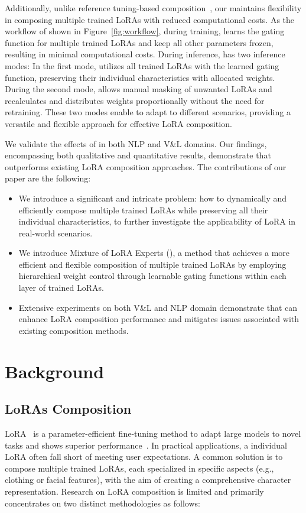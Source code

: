 Additionally, unlike reference tuning-based composition~\citep{gu2023mix}, our \our{} maintains flexibility in composing multiple trained LoRAs with reduced computational costs.
As the workflow of \our{} shown in Figure~\ref{fig:workflow}, during training, \our{} learns the gating function for multiple trained LoRAs and keep all other parameters frozen, resulting in minimal computational costs. During inference, \our{} has two inference modes:
In the first mode, \our{} utilizes all trained LoRAs with the learned gating function, preserving their individual characteristics with allocated weights.
During the second mode, \our{} allows manual masking of unwanted LoRAs and recalculates and distributes weights proportionally without the need for retraining.
These two modes enable \our{} to adapt to different scenarios, providing a versatile and flexible approach for effective LoRA composition.

We validate the effects of \our{} in both NLP and V\&L domains. Our findings, encompassing both qualitative and quantitative results, demonstrate that \our{} outperforms existing LoRA composition approaches.
The contributions of our paper are the following:
\begin{itemize}
\vspace{-1mm}
    \item We introduce a significant and intricate problem: how to dynamically and efficiently compose multiple trained LoRAs while preserving all their individual characteristics, to further investigate the applicability of LoRA in real-world scenarios.
    \item We introduce Mixture of LoRA Experts (\our{}), a method that achieves a more efficient and flexible composition of multiple trained LoRAs by employing hierarchical weight control through learnable gating functions within each layer of trained LoRAs.
    \item Extensive experiments on both V\&L and NLP domain demonstrate that \our{} can enhance LoRA composition performance and mitigates issues associated with existing composition methods.
\end{itemize}

\section{Background}

\subsection{LoRAs Composition}
\label{Sec:LoRA Merging}
LoRA~\citep{lora} is a parameter-efficient fine-tuning method to adapt large models to novel tasks and shows superior performance~\citep{lora,huang2023lorahub,zhang2023composing,sung2022vl}.
In practical applications, a individual LoRA often fall short of meeting user expectations. A common solution is to compose multiple trained LoRAs, each specialized in specific aspects (e.g., clothing or facial features), with the aim of creating a comprehensive character representation.
Research on LoRA composition is limited and primarily concentrates on two distinct methodologies as follows:


